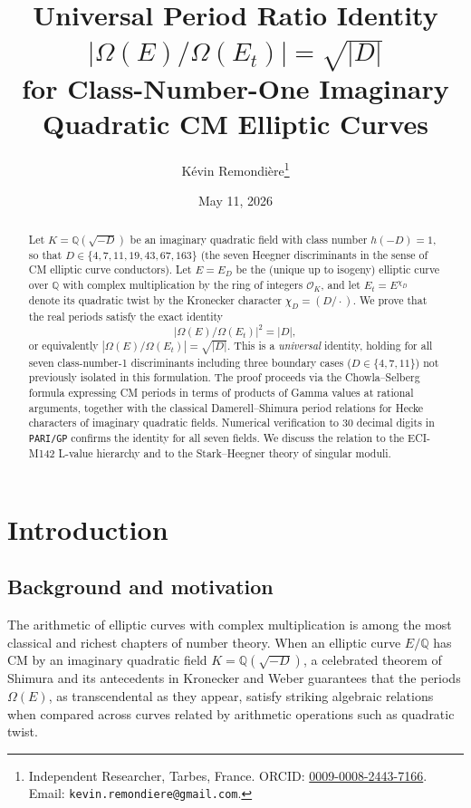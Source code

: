 \documentclass[12pt,a4paper]{article}
\title{Universal Period Ratio Identity
$|\Omega(E)/\Omega(E_t)| = \sqrt{|D|}$\\
for Class-Number-One Imaginary Quadratic CM Elliptic Curves}
\author{Kévin Remondière\thanks{Independent Researcher, Tarbes, France. ORCID: \href{https://orcid.org/0009-0008-2443-7166}{0009-0008-2443-7166}. Email: \texttt{kevin.remondiere@gmail.com}.}}
\date{May 11, 2026}
\theoremstyle{plain}
\theoremstyle{definition}
\newcommand{\Q}{\mathbb{Q}}
\newcommand{\OK}{\mathcal{O}_K}
\begin{document}
\maketitle

\begin{abstract}
Let $K = \Q(\sqrt{-D})$ be an imaginary quadratic field with class number
$h(-D) = 1$, so that $D \in \{4, 7, 11, 19, 43, 67, 163\}$ (the seven
Heegner discriminants in the sense of CM elliptic curve conductors).
Let $E = E_D$ be the (unique up to isogeny) elliptic curve over $\Q$ with
complex multiplication by the ring of integers $\OK$, and let $E_t = E^{\chi_D}$
denote its quadratic twist by the Kronecker character $\chi_D = (D/\cdot)$.
We prove that the real periods satisfy the exact identity
\[
  \bigl|\Omega(E)/\Omega(E_t)\bigr|^2 = |D|,
\]
or equivalently $|\Omega(E)/\Omega(E_t)| = \sqrt{|D|}$.
This is a \emph{universal} identity, holding for all seven class-number-1
discriminants including three boundary cases ($D \in \{4, 7, 11\}$) not
previously isolated in this formulation.
The proof proceeds via the Chowla--Selberg formula expressing CM periods in
terms of products of Gamma values at rational arguments, together with the
classical Damerell--Shimura period relations for Hecke characters of imaginary
quadratic fields.
Numerical verification to 30 decimal digits in \texttt{PARI/GP} confirms the
identity for all seven fields.
We discuss the relation to the ECI-M142 L-value hierarchy and to the
Stark--Heegner theory of singular moduli.
\end{abstract}

\tableofcontents

\newpage

\section{Introduction}
\label{sec:intro}

\subsection{Background and motivation}

The arithmetic of elliptic curves with complex multiplication is among the
most classical and richest chapters of number theory.  When an elliptic
curve $E/\Q$ has CM by an imaginary quadratic field $K = \Q(\sqrt{-D})$,
a celebrated theorem of Shimura \cite{Shimura1971} and its
antecedents in Kronecker and Weber guarantees that the periods $\Omega(E)$,
as transcendental as they appear, satisfy striking algebraic relations when
compared across curves related by arithmetic operations such as quadratic
twist.
\end{document}
